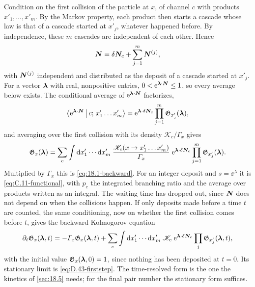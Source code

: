 Condition on the first collision of the particle at $x$, of channel $c$ with products $x'_1, \dots, x'_m$. By the Markov property, each product then starts a cascade whose law is that of a cascade started at $x'_j$, whatever happened before. By independence, these $m$ cascades are independent of each other. Hence
\begin{equation*}
  \bm{N} = \delta\bm{N}_c + \sum_{j=1}^m\bm{N}^{(j)} ,
\end{equation*}
with $\bm{N}^{(j)}$ independent and distributed as the deposit of a cascade started at $x'_j$. For a vector $\bm{\lambda}$ with real, nonpositive entries, $0 < \mathrm{e}^{\bm{\lambda}\cdot\bm{N}} \le 1$, so every average below exists. The conditional average of $\mathrm{e}^{\bm{\lambda}\cdot\bm{N}}$ factorizes,
\begin{equation*}
  \bigl\langle\mathrm{e}^{\bm{\lambda}\cdot\bm{N}}\,\big|\,c;\,x'_1\dots x'_m\bigr\rangle = \mathrm{e}^{\bm{\lambda}\cdot\delta\bm{N}_c}\prod_{j=1}^m\mathfrak{G}_{x'_j}(\bm{\lambda}) ,
\end{equation*}
and averaging over the first collision with its density $\mathscr{K}_c/\varGamma_x$ gives
\begin{equation}
  \mathfrak{G}_x(\bm{\lambda}) = \sum_c\int\mathrm{d} x'_1\cdots\mathrm{d} x'_m\;\frac{\mathscr{K}_c(x \to x'_1\dots x'_m)}{\varGamma_x}\;\mathrm{e}^{\bm{\lambda}\cdot\delta\bm{N}_c}\prod_{j=1}^m\mathfrak{G}_{x'_j}(\bm{\lambda}) .
  \label{eq:D.43-firststep}
\end{equation}
Multiplied by $\varGamma_x$ this is \cref{eq:18.1-backward}. For an integer deposit and $s = \ee^\lambda$ it is \cref{eq:C.11-functional}, with $p_c$ the integrated branching ratio and the average over products written as an integral. The waiting time has dropped out, since $\bm{N}$ does not depend on when the collisions happen. If only deposits made before a time $t$ are counted, the same conditioning, now on whether the first collision comes before $t$, gives the backward Kolmogorov equation
\begin{equation*}
  \partial_t\mathfrak{G}_x(\bm{\lambda},t) = -\varGamma_x\mathfrak{G}_x(\bm{\lambda},t) + \sum_c\int\mathrm{d} x'_1\cdots\mathrm{d} x'_m\;\mathscr{K}_c\;\mathrm{e}^{\bm{\lambda}\cdot\delta\bm{N}_c}\prod_j\mathfrak{G}_{x'_j}(\bm{\lambda},t) ,
\end{equation*}
with the initial value $\mathfrak{G}_x(\bm{\lambda},0) = 1$, since nothing has been deposited at $t = 0$. Its stationary limit is \cref{eq:D.43-firststep}. The time-resolved form is the one the kinetics of \cref{sec:18.5} needs; for the final pair number the stationary form suffices.

